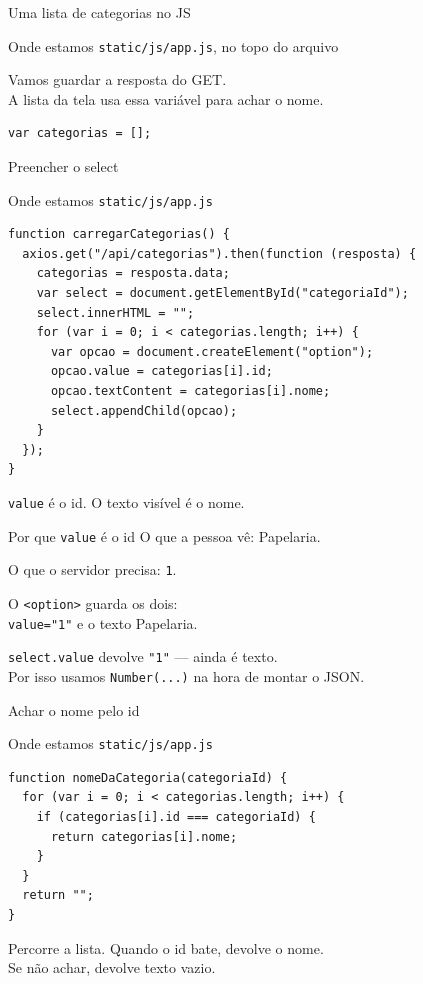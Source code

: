 \documentclass[aspectratio=169,11pt]{beamer}
\newcommand{\onde}[1]{%
  \begin{block}{Onde estamos}
    #1
  \end{block}
}
\begin{document}
\begin{frame}[fragile]{Uma lista de categorias no JS}
  \onde{\texttt{static/js/app.js}, no topo do arquivo}

  Vamos guardar a resposta do GET.\\
  A lista da tela usa essa variável para achar o nome.

\begin{lstlisting}[basicstyle=\ttfamily\footnotesize]
var categorias = [];
\end{lstlisting}
\end{frame}

\begin{frame}[fragile]{Preencher o select}
  \onde{\texttt{static/js/app.js}}

\begin{lstlisting}[basicstyle=\ttfamily\scriptsize]
function carregarCategorias() {
  axios.get("/api/categorias").then(function (resposta) {
    categorias = resposta.data;
    var select = document.getElementById("categoriaId");
    select.innerHTML = "";
    for (var i = 0; i < categorias.length; i++) {
      var opcao = document.createElement("option");
      opcao.value = categorias[i].id;
      opcao.textContent = categorias[i].nome;
      select.appendChild(opcao);
    }
  });
}
\end{lstlisting}

  \texttt{value} é o id. O texto visível é o nome.
\end{frame}

\begin{frame}{Por que \texttt{value} é o id}
  O que a pessoa vê: Papelaria.

  \vspace{0.5em}
  O que o servidor precisa: \texttt{1}.

  \vspace{0.5em}
  O \texttt{<option>} guarda os dois:\\
  \texttt{value="1"} e o texto Papelaria.

  \vspace{0.5em}
  \texttt{select.value} devolve \texttt{"1"} --- ainda é texto.\\
  Por isso usamos \texttt{Number(...)} na hora de montar o JSON.
\end{frame}

\begin{frame}[fragile]{Achar o nome pelo id}
  \onde{\texttt{static/js/app.js}}

\begin{lstlisting}[basicstyle=\ttfamily\footnotesize]
function nomeDaCategoria(categoriaId) {
  for (var i = 0; i < categorias.length; i++) {
    if (categorias[i].id === categoriaId) {
      return categorias[i].nome;
    }
  }
  return "";
}
\end{lstlisting}

  Percorre a lista. Quando o id bate, devolve o nome.\\
  Se não achar, devolve texto vazio.
\end{frame}
\end{document}
